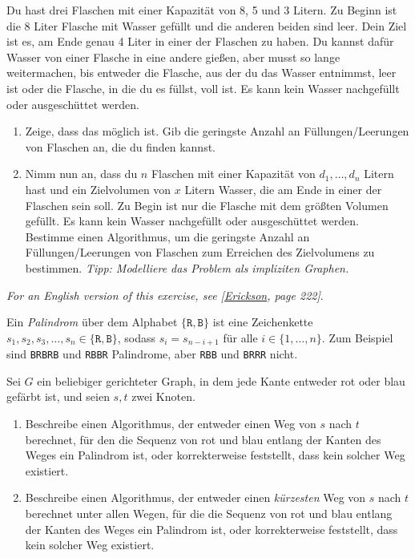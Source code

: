 \documentclass{uebung_cs}
\begin{document}
\begin{aufgabe}
Du hast drei Flaschen mit einer Kapazität von 8, 5 und 3 Litern.
Zu Beginn ist die 8 Liter Flasche mit Wasser gefüllt und die anderen beiden sind leer.
Dein Ziel ist es, am Ende genau 4 Liter in einer der Flaschen zu haben. Du kannst dafür Wasser von einer Flasche in eine andere gießen, aber musst so lange weitermachen, bis entweder die Flasche, aus der du das Wasser entnimmst, leer ist oder die Flasche, in die du es füllst, voll ist.
Es kann kein Wasser nachgefüllt oder ausgeschüttet werden.
\begin{enumerate}
	\item %
  Zeige, dass das möglich ist. Gib die geringste Anzahl an Füllungen/Leerungen von Flaschen an, die du finden kannst.
	\item %
  Nimm nun an, dass du $n$ Flaschen mit einer Kapazität von $d_1, \ldots, d_n$ Litern hast und ein Zielvolumen von $x$ Litern Wasser, die am Ende in einer der Flaschen sein soll.
	Zu Begin ist nur die Flasche mit dem größten Volumen gefüllt.
	Es kann kein Wasser nachgefüllt oder ausgeschüttet werden.\\
	Bestimme einen Algorithmus, um die geringste Anzahl an Füllungen/Leerungen von Flaschen zum Erreichen des Zielvolumens zu bestimmen.
	\textit{Tipp: Modelliere das Problem als impliziten Graphen.}
\end{enumerate}
\end{aufgabe}

\begin{aufgabe}
  \textit{\footnotesize For an English version of this exercise, see [\href{https://jeffe.cs.illinois.edu/teaching/algorithms/book/Algorithms-JeffE.pdf}{Erickson}, page 222]}.

  Ein \emph{Palindrom} über dem Alphabet $\{\texttt{R},\texttt{B}\}$ ist eine Zeichenkette $s_1,s_2,s_3,\dots,s_n\in\{\texttt{R},\texttt{B}\}$, sodass $s_i=s_{n-i+1}$ für alle $i\in\{1,\dots,n\}$. Zum Beispiel sind \texttt{BRBRB} und \texttt{RBBR} Palindrome, aber \texttt{RBB} und \texttt{BRRR} nicht.
  
  Sei $G$ ein beliebiger gerichteter Graph, in dem jede Kante entweder rot oder blau gefärbt ist, und seien $s,t$ zwei Knoten.
  \begin{enumerate}
      \item \mittel Beschreibe einen Algorithmus, der entweder einen Weg von $s$ nach $t$ berechnet, für den die Sequenz von rot und blau entlang der Kanten des Weges ein Palindrom ist, oder korrekterweise feststellt, dass kein solcher Weg existiert.
      \item \note Beschreibe einen Algorithmus, der entweder einen \emph{kürzesten} Weg von $s$ nach $t$ berechnet unter allen Wegen, für die die Sequenz von rot und blau entlang der Kanten des Weges ein Palindrom ist, oder korrekterweise feststellt, dass kein solcher Weg existiert.
  \end{enumerate}
  
\end{aufgabe}
\end{document}
